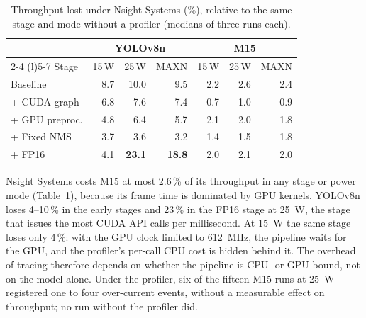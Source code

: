 \begin{table}[H]
  \centering
  \small
  \setlength{\tabcolsep}{4pt}
  \begin{tabular}{@{}lrrrrrr@{}}
    \toprule
    & \multicolumn{3}{c}{YOLOv8n} & \multicolumn{3}{c}{M15} \\
    \cmidrule(lr){2-4} \cmidrule(l){5-7}
    Stage & 15\,W & 25\,W & MAXN & 15\,W & 25\,W & MAXN \\
    \midrule
    Baseline       &  8.7 & 10.0 &  9.5 & 2.2 & 2.6 & 2.4 \\
    + CUDA graph   &  6.8 &  7.6 &  7.4 & 0.7 & 1.0 & 0.9 \\
    + GPU preproc. &  4.8 &  6.4 &  5.7 & 2.1 & 2.0 & 1.8 \\
    + Fixed NMS    &  3.7 &  3.6 &  3.2 & 1.4 & 1.5 & 1.8 \\
    + FP16         &  4.1 & \textbf{23.1} & \textbf{18.8} & 2.0 & 2.1 & 2.0 \\
    \bottomrule
  \end{tabular}
  \vspace{0.5em}
  \caption{Throughput lost under Nsight Systems (\%), relative to the same
  stage and mode without a profiler (medians of three runs each).}
  \label{tab:profiler-overhead}
\end{table}
\vspace{-0.6em}

Nsight Systems costs M15 at most 2.6\,\% of its throughput in any stage or
power mode (Table~\ref{tab:profiler-overhead}), because its frame time is
dominated by GPU kernels. YOLOv8n loses 4--10\,\% in the early stages and 23\,\%
in the FP16 stage at 25~W, the stage that issues the most CUDA API calls per
millisecond. At 15~W the same stage loses only 4\,\%: with the GPU clock
limited to 612~MHz, the pipeline waits for the GPU, and the profiler's
per-call CPU cost is hidden behind it. The overhead of tracing therefore
depends on whether the pipeline is CPU- or GPU-bound, not on the model alone.
Under the profiler, six of the fifteen M15 runs at 25~W registered one to four
over-current events, without a measurable effect on throughput; no run
without the profiler did.
